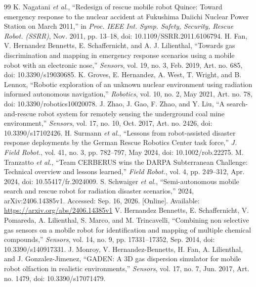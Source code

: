\begin{thebibliography}{99}
\linespread{1}\fontsize{9}{10.7}\selectfont
\setlength{\itemsep}{2pt}
\setlength{\parsep}{0pt}
\setlength{\parskip}{0pt}
K. Nagatani \textit{et al.}, ``Redesign of rescue mobile robot Quince: Toward emergency response to the nuclear accident at Fukushima Daiichi Nuclear Power Station on March 2011,'' in \textit{Proc. IEEE Int. Symp. Safety, Security, Rescue Robot. (SSRR)}, Nov. 2011, pp. 13--18, doi: 10.1109/SSRR.2011.6106794.
H. Fan, V. Hernandez Bennetts, E. Schaffernicht, and A. J. Lilienthal, ``Towards gas discrimination and mapping in emergency response scenarios using a mobile robot with an electronic nose,'' \textit{Sensors}, vol. 19, no. 3, Feb. 2019, Art. no. 685, doi: 10.3390/s19030685.
K. Groves, E. Hernandez, A. West, T. Wright, and B. Lennox, ``Robotic exploration of an unknown nuclear environment using radiation informed autonomous navigation,'' \textit{Robotics}, vol. 10, no. 2, May 2021, Art. no. 78, doi: 10.3390/robotics10020078.
J. Zhao, J. Gao, F. Zhao, and Y. Liu, ``A search-and-rescue robot system for remotely sensing the underground coal mine environment,'' \textit{Sensors}, vol. 17, no. 10, Oct. 2017, Art. no. 2426, doi: 10.3390/s17102426.
H. Surmann \textit{et al.}, ``Lessons from robot-assisted disaster response deployments by the German Rescue Robotics Center task force,'' \textit{J. Field Robot.}, vol. 41, no. 3, pp. 782--797, May 2024, doi: 10.1002/rob.22275.
M. Tranzatto \textit{et al.}, ``Team CERBERUS wins the DARPA Subterranean Challenge: Technical overview and lessons learned,'' \textit{Field Robot.}, vol. 4, pp. 249--312, Apr. 2024, doi: 10.55417/fr.2024009.
S. Schwaiger \textit{et al.}, ``Semi-autonomous mobile search and rescue robot for radiation disaster scenarios,'' 2024, arXiv:2406.14385v1. Accessed: Sep. 16, 2026. [Online]. Available: \url{https://arxiv.org/abs/2406.14385v1}
V. Hernandez Bennetts, E. Schaffernicht, V. Pomareda, A. Lilienthal, S. Marco, and M. Trincavelli, ``Combining non selective gas sensors on a mobile robot for identification and mapping of multiple chemical compounds,'' \textit{Sensors}, vol. 14, no. 9, pp. 17331--17352, Sep. 2014, doi: 10.3390/s140917331.
J. Monroy, V. Hernandez-Bennetts, H. Fan, A. Lilienthal, and J. Gonzalez-Jimenez, ``GADEN: A 3D gas dispersion simulator for mobile robot olfaction in realistic environments,'' \textit{Sensors}, vol. 17, no. 7, Jun. 2017, Art. no. 1479, doi: 10.3390/s17071479.

\end{thebibliography}
